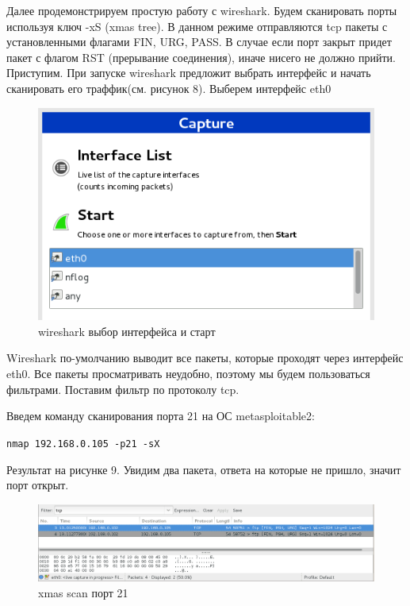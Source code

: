 \documentclass[11pt, a4paper]{article}		%
\begin{document}
Далее продемонстрируем простую работу с wireshark. 
Будем сканировать порты используя ключ -xS (xmas tree). В данном режиме отправляются tcp пакеты с установленными флагами FIN, URG, PASS.
В случае если порт закрыт придет пакет с флагом RST (прерывание соединения), иначе нисего не должно прийти. Приступим.
При запуске wireshark предложит выбрать интерфейс и начать сканировать его траффик(см. рисунок 8). Выберем интерфейс eth0

\begin{figure}[h!]
\centering
\includegraphics[scale=0.8]{res/wireshark_int}
\caption{wireshark выбор интерфейса и старт}
\end{figure}

Wireshark по-умолчанию выводит все пакеты, которые проходят через интерфейс eth0. Все пакеты просматривать неудобно, поэтому мы будем пользоваться фильтрами. Поставим фильтр по протоколу tcp.

Введем команду сканирования порта 21 на ОС metasploitable2: 

\verb'nmap 192.168.0.105 -p21 -sX'

Результат на рисунке 9. Увидим два пакета, ответа на которые не пришло, значит порт открыт.

\begin{figure}[h!]
\centering
\includegraphics[scale=0.8]{res/xmas_scan_21}
\caption{xmas scan порт 21}
\end{figure}
\end{document}

